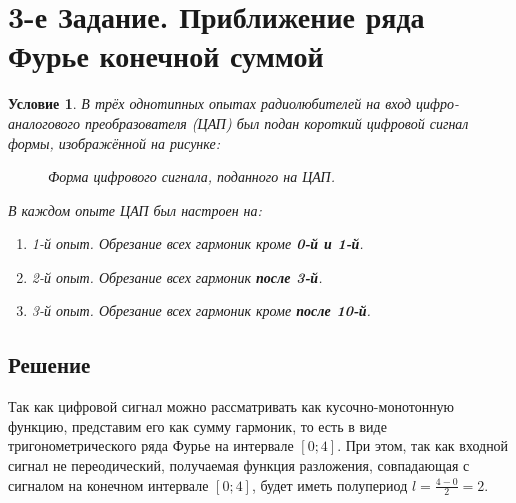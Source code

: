 \documentclass[12pt, a4paper]{article}
\newtheorem*{task}{Условие}
\begin{document}
\section{3-е Задание. Приближение ряда Фурье конечной суммой}
\begin{task}
В трёх однотипных опытах радиолюбителей на вход цифро-аналогового преобразователя
(ЦАП) был подан короткий цифровой сигнал формы, изображённой на рисунке:
\begin{figure}[H]
\centering
{}
\caption{Форма цифрового сигнала, поданного на ЦАП.}
\label{gr:3}
\end{figure}
В каждом опыте ЦАП был настроен на:

\begin{enumerate}
\item[] 1-й опыт. Обрезание всех гармоник кроме \textbf{0-й и 1-й}.

\item[] 2-й опыт. Обрезание всех гармоник  \textbf{после 3-й}.

\item[] 3-й опыт. Обрезание всех гармоник кроме \textbf{после 10-й}.

\end{enumerate}
\end{task}
\subsection{Решение}
Так как цифровой сигнал можно рассматривать как кусочно-монотонную функцию, представим его как сумму гармоник, то есть в виде тригонометрического ряда Фурье на интервале $\left[0;4\right]$. При этом, так как входной сигнал не переодический, получаемая функция разложения, совпадающая с сигналом на конечном интервале $\left[0;4\right]$, будет иметь полупериод $l=\frac{4-0}{2}=2$.
\end{document}
